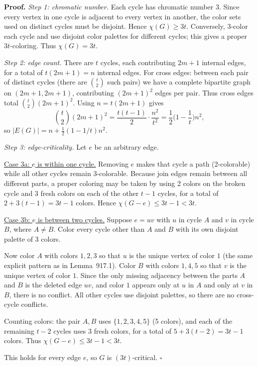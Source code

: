 \noindent\textbf{Proof.}
\emph{Step 1: chromatic number.} Each cycle has chromatic number $3$. Since every vertex in one cycle is adjacent to every vertex in another, the color sets used on distinct cycles must be disjoint. Hence $\chi(G)\ge 3t$. Conversely, 3-color each cycle and use disjoint color palettes for different cycles; this gives a proper $3t$-coloring. Thus $\chi(G)=3t$.

\emph{Step 2: edge count.} There are $t$ cycles, each contributing $2m+1$ internal edges, for a total of $t(2m+1)=n$ internal edges. For cross edges: between each pair of distinct cycles (there are $\binom{t}{2}$ such pairs) we have a complete bipartite graph on $(2m+1,2m+1)$, contributing $(2m+1)^2$ edges per pair. Thus cross edges total $\binom{t}{2}(2m+1)^2$. Using $n=t(2m+1)$ gives
\[
\binom{t}{2}(2m+1)^2 = \frac{t(t-1)}{2}\cdot \frac{n^2}{t^2}=\frac12\Big(1-\frac1t\Big)n^2,
\]
so $|E(G)|=n+\frac12(1-1/t)n^2$.

\emph{Step 3: edge-criticality.} Let $e$ be an arbitrary edge.

\smallskip
\noindent\underline{Case 3a: $e$ is within one cycle.} Removing $e$ makes that cycle a path (2-colorable) while all other cycles remain 3-colorable. Because join edges remain between all different parts, a proper coloring may be taken by using 2 colors on the broken cycle and 3 fresh colors on each of the other $t-1$ cycles, for a total of $2+3(t-1)=3t-1$ colors. Hence $\chi(G-e)\le 3t-1<3t$.

\smallskip
\noindent\underline{Case 3b: $e$ is between two cycles.} Suppose $e=uv$ with $u$ in cycle $A$ and $v$ in cycle $B$, where $A\ne B$. Color every cycle other than $A$ and $B$ with its own disjoint palette of $3$ colors.

Now color $A$ with colors $1,2,3$ so that $u$ is the unique vertex of color $1$ (the same explicit pattern as in Lemma~917.1). Color $B$ with colors $1,4,5$ so that $v$ is the unique vertex of color $1$. Since the only missing adjacency between the parts $A$ and $B$ is the deleted edge $uv$, and color $1$ appears only at $u$ in $A$ and only at $v$ in $B$, there is no conflict. All other cycles use disjoint palettes, so there are no cross-cycle conflicts.

Counting colors: the pair $A,B$ uses $\{1,2,3,4,5\}$ (5 colors), and each of the remaining $t-2$ cycles uses 3 fresh colors, for a total of $5+3(t-2)=3t-1$ colors. Thus $\chi(G-e)\le 3t-1<3t$.

This holds for every edge $e$, so $G$ is $(3t)$-critical. \hfill$\square$

